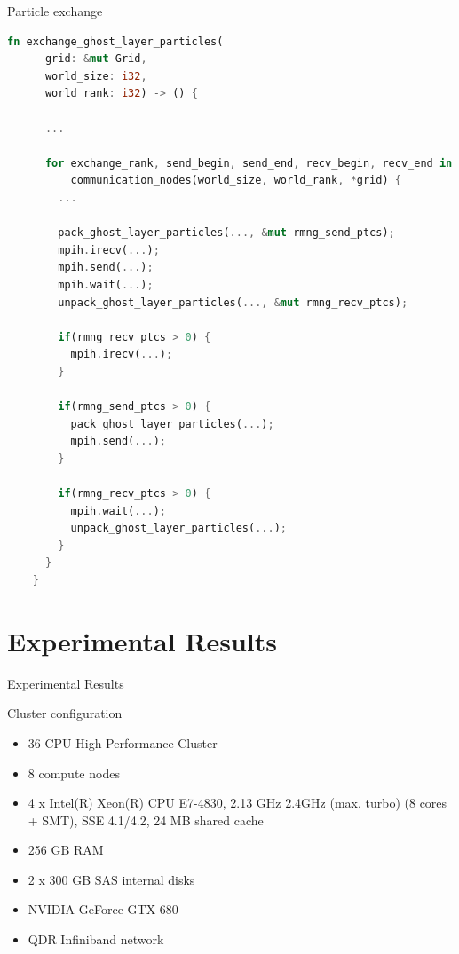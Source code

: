 \documentclass[aspectratio=43,t]{beamer}
\begin{document}
  \begin{frame}[fragile]{Particle exchange}
    \begin{lstlisting}[basicstyle=\tiny\ttfamily,language=Rust]
    fn exchange_ghost_layer_particles(
      grid: &mut Grid,
      world_size: i32,
      world_rank: i32) -> () {

      ...

      for exchange_rank, send_begin, send_end, recv_begin, recv_end in
          communication_nodes(world_size, world_rank, *grid) {
        ...

        pack_ghost_layer_particles(..., &mut rmng_send_ptcs);
        mpih.irecv(...);
        mpih.send(...);
        mpih.wait(...);
        unpack_ghost_layer_particles(..., &mut rmng_recv_ptcs);

        if(rmng_recv_ptcs > 0) {
          mpih.irecv(...);
        }

        if(rmng_send_ptcs > 0) {
          pack_ghost_layer_particles(...);
          mpih.send(...);
        }

        if(rmng_recv_ptcs > 0) {
          mpih.wait(...);
          unpack_ghost_layer_particles(...);
        }
      }
    }
    \end{lstlisting}
  \end{frame}
  
  \section{Experimental Results}
  \begin{frame}{Experimental Results}
    \begin{block}{Cluster configuration}
      \begin{itemize}
        \item 36-CPU High-Performance-Cluster
        \item 8 compute nodes
        \item 4 x Intel(R) Xeon(R) CPU E7-4830, 2.13 GHz 2.4GHz (max. turbo) (8 cores + SMT), SSE 4.1/4.2, 24 MB shared cache
        \item 256 GB RAM
        \item 2 x 300 GB SAS internal disks
        \item NVIDIA GeForce GTX 680
        \item QDR Infiniband network
      \end{itemize}
    \end{block}
  \end{frame}
\end{document}
